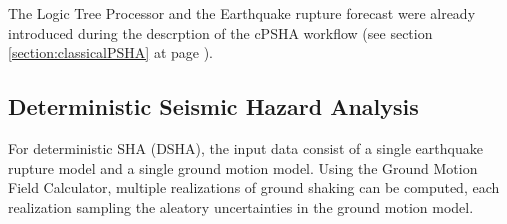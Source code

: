 The Logic Tree Processor and the Earthquake rupture forecast were already 
introduced during the descrption of the cPSHA workflow (see section 
\ref{section:classicalPSHA} at page \pageref{section:classicalPSHA}).
%
\subsection{Deterministic Seismic Hazard Analysis}
\label{section:deterministicSHA}
For deterministic SHA (DSHA), the input data consist of a single earthquake 
rupture model and a single ground motion model. Using the Ground Motion Field 
Calculator, multiple realizations of ground shaking can be computed, each 
realization sampling the aleatory uncertainties in the ground motion model.


